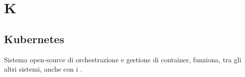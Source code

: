 \section*{K}
\markright{}
\subsection*{Kubernetes}
Sistema open-source di orchestrazione e gestione di container, funziona, tra gli altri sistemi, anche con i .